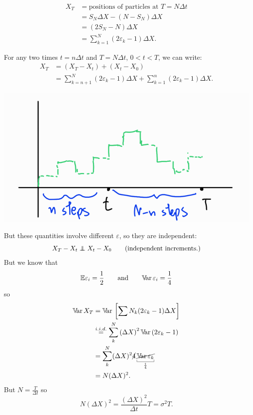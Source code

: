 \documentclass[12pt]{report}
\begin{document}
\begin{align*}
	X_{T}&=\text{positions of particles at }T=N\Delta t\\
	&=S_{N}\Delta X-(N-S_{N})\Delta X\\
	&=(2S_{N}-N)\Delta X\\
	&=\sum_{k=1}^{N}(2\varepsilon_{k}-1)\Delta X.
\end{align*}
\begin{remark}
	For any two times $t=n\Delta t$ and $T=N\Delta t$, $0<t<T$, we can write:
	\begin{align*}
		X_{T}&=(X_{T}-X_{t})+(X_{t}-X_{0})\\
		&=\sum_{k=n+1}^{N}(2\varepsilon_{k}-1)\Delta X+\sum_{k=1}^{n}(2\varepsilon_{k}-1)\Delta X.
	\end{align*}
		\begin{center}
			\includegraphics[width=0.5\linewidth]{img/screenshot010}
		\end{center}
	But these quantities involve different $\varepsilon$, so they are independent:
	\begin{equation*}
		X_{T}-X_{t}\independent X_{t}-X_{0}\qquad\text{(independent increments.)}
	\end{equation*}
	But we know that 
	\begin{equation*}
		\mathbb{E}\varepsilon_{i}=\frac{1}{2}\qquad\mathrm{and}\qquad\mathbb{V}\!\mathrm{ar}\,\varepsilon_{i}=\frac{1}{4}
	\end{equation*}
	so
	\begin{align*}
		\var X_{T}&=\var\left[\sum^{}{N}_{k}(2\varepsilon_{k}-1)\Delta X\right]\\
		&\overset{i.i.d.}{=}\sum^{N}_{k}\left(\Delta X\right)^{2}\var(2\varepsilon_{k}-1)\\
		&=\sum_{k}^{N}(\Delta X)^{2}\cancel{4}\ubracketthin{\cancel{\var \varepsilon_{k}}}_{\frac{1}{4}}\\
		&=N(\Delta X)^{2}.
	\end{align*}
	But $N=\frac{T}{\Delta t}$ so 
	\begin{equation*}
		N(\Delta X)^{2}=\frac{(\Delta X)^{2}}{\Delta t}T=\sigma^{2}T.
	\end{equation*}
\end{remark}
\end{document}
